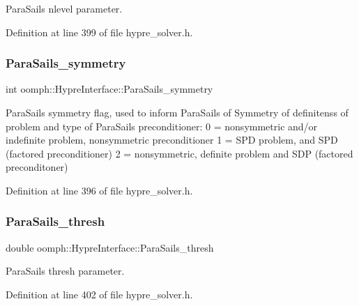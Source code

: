 Para\+Sails nlevel parameter. 



Definition at line 399 of file hypre\+\_\+solver.\+h.

\mbox{\label{classoomph_1_1HypreInterface_a3cdba8c59c318125fbb367207f1082b6}} 
\subsubsection{\texorpdfstring{Para\+Sails\+\_\+symmetry}{ParaSails\_symmetry}}
{\footnotesize\ttfamily int oomph\+::\+Hypre\+Interface\+::\+Para\+Sails\+\_\+symmetry\hspace{0.3cm}{\ttfamily [protected]}}



Para\+Sails symmetry flag, used to inform Para\+Sails of Symmetry of definitenss of problem and type of Para\+Sails preconditioner\+: 0 = nonsymmetric and/or indefinite problem, nonsymmetric preconditioner 1 = S\+PD problem, and S\+PD (factored preconditioner) 2 = nonsymmetric, definite problem and S\+DP (factored preconditoner) 



Definition at line 396 of file hypre\+\_\+solver.\+h.

\mbox{\label{classoomph_1_1HypreInterface_a8deadae96f1791b9f2552505cc68af2d}} 
\subsubsection{\texorpdfstring{Para\+Sails\+\_\+thresh}{ParaSails\_thresh}}
{\footnotesize\ttfamily double oomph\+::\+Hypre\+Interface\+::\+Para\+Sails\+\_\+thresh\hspace{0.3cm}{\ttfamily [protected]}}



Para\+Sails thresh parameter. 



Definition at line 402 of file hypre\+\_\+solver.\+h.

